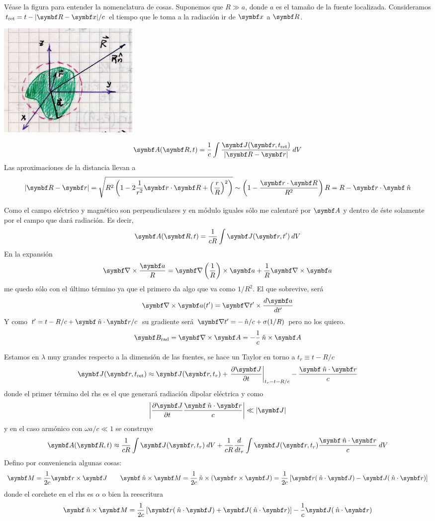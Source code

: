 \documentclass[10pt,oneside]{CBFT_book}
\begin{document}
Véase la figura para entender la nomenclatura de cosas. Suponemos que $ R \gg a $, donde $a$ es el 
tamaño de la fuente localizada. Consideramos $ t_\text{ret} = t - |\vb{R} - \vbx|/c$ el tiempo que
le toma a la radiación ir de $\vbx$ a $\vb{R}$.

\includegraphics[width=0.3\textwidth]{images/fig_ft1_rad_dipolar_cuadrupolar.jpg}

\[
	\vb{A}(\vb{R},t) = \frac{1}{c} \int \frac{ \vb{J}(\vb{r},t_\text{ret})}{|\vb{R}-\vb{r}|} \: dV
\]
Las aproximaciones de la distancia llevan a
\[
	|\vb{R} -\vb r | = \sqrt{ R^2 \left( 1 - 2 \frac{1}{r^2}\pe{r}{R} + \Frac{r}{R}^2 \right) } 
	\sim \left( 1 - \frac{\pe{r}{R}}{R^2} \right) R = R - \pe{r}{\nver}
\]

Como el campo eléctrico y magnético son perpendiculares y en módulo iguales sólo me calentaré
por $\vb A$ y dentro de éste solamente por el campo que dará radiación. Es decir,
\[
	\vb{A}(\vb{R},t) = \frac{ 1 }{ c R } \int \vb{J}(\vb r,t') \: dV
\]
En la expansión
\[
	\Nabla\times\frac{\vb a}{R} = \Nabla\Frac{1}{R} \times\vb a + \frac{1}{R} \rotorm{a}
\]
me quedo sólo con el último término ya que el primero da algo que va como $1/R^2$. El que
sobrevive, será
\[
	\rotorm{a}(t') = \Nabla t' \times \dtot{\vb a}{t'}
\]
Y como $ t' = t - R/c + \pe{\nver}{r} / c $ su gradiente  será $ \Nabla t' = - \nver/c + \sigma(1/R)$
pero no los quiero.
\[
	\vb{B}_\text{rad} = \rotorm{A} = - \frac{1}{c} \nver \times \vb A
\]

Estamos en $\lambda$ muy grandes respecto a la dimensión de las fuentes, se hace un Taylor en torno
a $t_r \equiv t - R/c$
\[
	\vb{J}(\vb r,t_\text{ret}) \approx \vb{J}(\vb r,t_r ) + 
	\left. \dpar{\vb J}{t}\right|_{t_r-t-R/c} - \frac{\pe{\nver}{r}}{c}
\]
donde el primer término del rhs es el que generará radiación dipolar eléctrica y como
\[
	\left| \dpar{\vb J}{t} \frac{\pe{\nver}{r}}{c} \right| \ll |\vb J|
\]
y en el caso armónico con $ \omega a / c \ll 1$ se construye
\[
	\vb{A}(\vb{R},t) \approx \frac{ 1 }{ c R } \int \vb{J}(\vb r,t_r) \: dV
	+ \frac{ 1 }{ c R } \dtot{}{t_r} \int \vb{J}(\vb r,t_r) \frac{\pe{\nver}{r}}{c} \: dV
\]
Defino por conveniencia algunas cosas:
\[
	\vb M = \frac{1}{2c} \pv{r}{J} \qquad 
	\pv{\nver}{M} = \frac{1}{2c} \nver\times( \pv{r}{J}) =
	\frac{1}{2c} \left[ \vb{r}(\nver\cdot\vb J) - \vb{J}(\nver\cdot\vb r)\right]
\]
donde el corchete en el rhs es $\alpha$ o bien la reescritura
\[
	\pv{\nver}{M} =  \frac{1}{2c} \left[ \vb{r}(\nver\cdot\vb J) + \vb{J}(\nver\cdot\vb r)\right]
	- \frac{1}{c} \vb{J}(\nver\cdot\vb r)
\]
\end{document}
